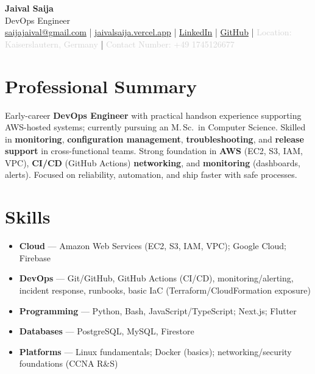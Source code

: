 \documentclass[11pt,a4paper]{article}
\begin{document}
\frenchspacing
{}
\setlength{\emergencystretch}{6em}
\sloppy

\begin{center}
\begin{minipage}{0.92\textwidth}
\centering
    {\Huge\bfseries Jaival Saija}\\[0.5pt]
    {\large DevOps Engineer}\\[2pt]
    {\small
    \href{mailto:saijajaival@gmail.com}{saijajaival@gmail.com} \quad | \quad
    \href{https://jaivalsaija.vercel.app}{jaivalsaija.vercel.app} \quad | \quad
    \href{https://linkedin.com/in/jaivalsaija}{LinkedIn} \quad | \quad
    \href{https://github.com/Jaival}{GitHub} \quad | \quad
    \textcolor{lightgray}{Location: Kaiserslautern, Germany} \quad | \quad
    \textcolor{lightgray}{Contact Number: +49 1745126677}
    }
\end{minipage}
\end{center}

\vspace{4pt}

\section*{Professional Summary}
{\normalsize Early-career \textbf{DevOps Engineer} with practical hands\textendash{}on experience supporting AWS-hosted systems; currently pursuing an M.\,Sc.\ in Computer Science. Skilled in \textbf{monitoring}, \textbf{configuration management}, \textbf{troubleshooting}, and \textbf{release support} in cross-functional teams. Strong foundation in \textbf{AWS} (EC2, S3, IAM, VPC), \textbf{CI/CD} (GitHub Actions) \textbf{networking}, and \textbf{monitoring} (dashboards, alerts). Focused on reliability, automation, and ship faster with safe processes.}

\section*{Skills}
{\footnotesize
\begin{itemize}
    \item \textbf{Cloud} — Amazon Web Services (EC2, S3, IAM, VPC); Google Cloud; Firebase
    \item \textbf{DevOps} — Git/GitHub, GitHub Actions (CI/CD), monitoring/alerting, incident response, runbooks, basic IaC (Ter\-raform/CloudFormation exposure)
    \item \textbf{Programming} — Python, Bash, JavaScript/TypeScript; Next.js; Flutter
    \item \textbf{Databases} — PostgreSQL, MySQL, Firestore
    \item \textbf{Platforms} — Linux fundamentals; Docker (basics); networking/security foundations (CCNA R\&S)
\end{itemize}}
\end{document}
